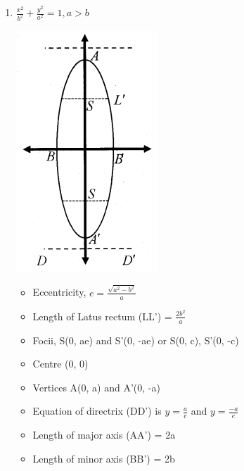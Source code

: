 \documentclass[12pt]{article}
\begin{document}
\begin{multicols}{2}
\begin{enumerate}
    \item $\frac{x^2}{b^2}+\frac{y^2}{a^2}=1,a>b$ \begin{center}
        \includegraphics*[scale=0.8]{6.png}
    \end{center}
    \begin{itemize}
        \item Eccentricity, $e = \frac{\sqrt{a^2-b^2}}{a}$
        \item Length of Latus rectum (LL’) = $\frac{2b^2}{a}$
        \item Focii, S(0, ae) and S'(0, -ae) or S(0, c), S'(0, -c)
        \item  Centre (0, 0)
        \item Vertices A(0, a) and A'(0, -a)
        \item Equation of directrix (DD’) is $y = \frac{a}{e}$ and $y = \frac{-a}{e}$
        \item Length of major axis (AA’) = 2a
        \item Length of minor axis (BB’) = 2b
    \end{itemize}


\end{enumerate}


\end{multicols}
\end{document}

